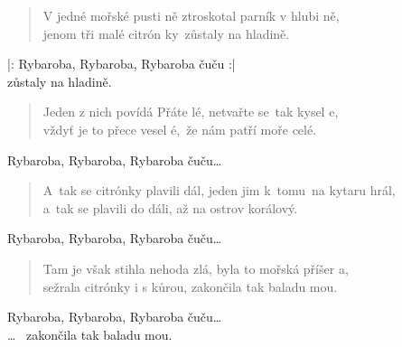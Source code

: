 \begin{song}{}
\begin{verse}
   V jedné mořské pusti ně ztroskotal parník v hlubi ně, \\
   jenom tři malé citrón ky~zůstaly na hladině.
\end{verse}
\begin{refren}
   |: Rybaroba, Rybaroba, Rybaroba čuču :|  \\
   zůstaly na hladině.
\end{refren}
\begin{verse}
   Jeden z nich povídá Přáte lé, netvařte se~tak kysel e, \\
   vždyť je to přece vesel é,~že nám patří moře celé. 
\end{verse}
\begin{refren}
   Rybaroba, Rybaroba, Rybaroba čuču\ldots
\end{refren}
\begin{verse}
   A~tak se citrónky plavili dál, jeden jim k~tomu~na kytaru hrál, \\
   a~tak se plavili do dáli, až na ostrov korálový.
\end{verse}
\begin{refren}
   Rybaroba, Rybaroba, Rybaroba čuču\ldots
\end{refren}
\begin{verse}
   Tam je však stihla nehoda zlá, byla to mořská příšer a, \\
   sežrala citrónky i s kůrou, zakončila tak baladu mou.
\end{verse}
\begin{refren}
   Rybaroba, Rybaroba, Rybaroba čuču\ldots \\
   \ldots~ zakončila tak baladu mou.
\end{refren}
\end{song}
\pagebreak